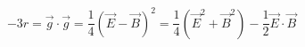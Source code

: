 \begin{equation}
-3 r =\vec{g} \cdot \vec{g}= \frac{1}{4} (\vec{E} -\vec{B})^{2} = \frac{1}{4} ( \vec{E}^{2}
+\vec{B}^{2}) - \frac{1}{2} \vec{E} \cdot \vec{B}
\end{equation}


